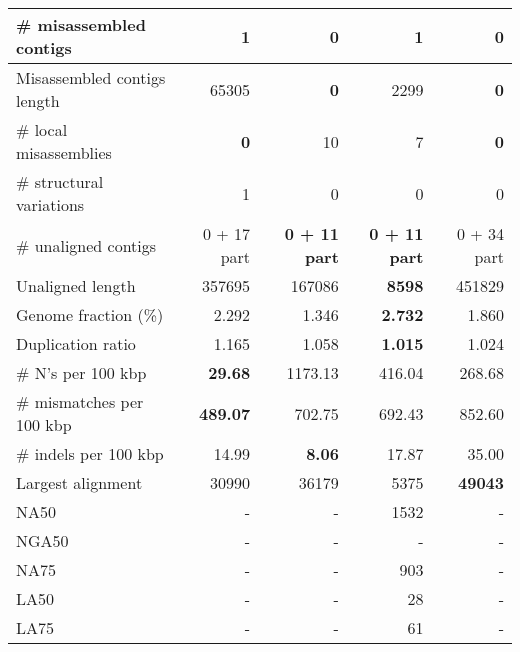 \documentclass[12pt,a4paper]{article}
\begin{document}
\begin{table}[ht]
\begin{center}
\begin{tabular}{|l*{4}{|r}|}
\# misassembled contigs & 1 & {\bf 0} & 1 & {\bf 0} \\ \hline
Misassembled contigs length & 65305 & {\bf 0} & 2299 & {\bf 0} \\ \hline
\# local misassemblies & {\bf 0} & 10 & 7 & {\bf 0} \\ \hline
\# structural variations & 1 & 0 & 0 & 0 \\ \hline
\# unaligned contigs & 0 + 17 part & {\bf 0 + 11 part} & {\bf 0 + 11 part} & 0 + 34 part \\ \hline
Unaligned length & 357695 & 167086 & {\bf 8598} & 451829 \\ \hline
Genome fraction (\%) & 2.292 & 1.346 & {\bf 2.732} & 1.860 \\ \hline
Duplication ratio & 1.165 & 1.058 & {\bf 1.015} & 1.024 \\ \hline
\# N's per 100 kbp & {\bf 29.68} & 1173.13 & 416.04 & 268.68 \\ \hline
\# mismatches per 100 kbp & {\bf 489.07} & 702.75 & 692.43 & 852.60 \\ \hline
\# indels per 100 kbp & 14.99 & {\bf 8.06} & 17.87 & 35.00 \\ \hline
Largest alignment & 30990 & 36179 & 5375 & {\bf 49043} \\ \hline
NA50 & - & - & 1532 & - \\ \hline
NGA50 & - & - & - & - \\ \hline
NA75 & - & - & 903 & - \\ \hline
LA50 & - & - & 28 & - \\ \hline
LA75 & - & - & 61 & - \\ \hline
\end{tabular}
\end{center}
\end{table}
\end{document}
